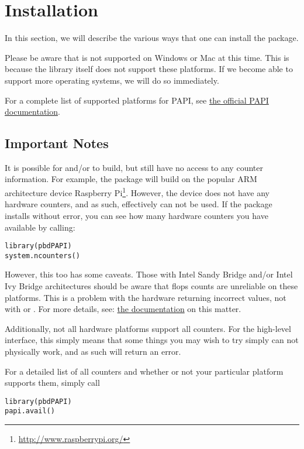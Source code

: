 \section{Installation}
\label{sec:installation}

In this section, we will describe the various ways that one can install the 
\thispackage package.

Please be aware that \thispackage is not supported on Windows or Mac at this 
time.  This is because the \PAPI library itself does not support these 
platforms.  If we become able to support more operating systems, we will do so 
immediately.

For a complete list of supported platforms for PAPI, see 
\href{http://icl.cs.utk.edu/papi/custom/index.html?lid=62&slid=96}%
{the official PAPI documentation}.



\subsection{Important Notes}

It is possible for \PAPI and/or \thispackage to build, but still have no access
to any counter information.  For example, the package will build on the popular 
ARM architecture device 
Raspberry Pi\footnote{\url{http://www.raspberrypi.org/}}.
However, the device does not have any hardware counters, and as such, 
\thispackage effectively can not be used.  If the package installs without 
error, you can see how many hardware counters you have available by calling:
\begin{lstlisting}[language=rr]
library(pbdPAPI)
system.ncounters()
\end{lstlisting}

However, this too has some caveats.  Those with Intel Sandy Bridge and/or Intel 
Ivy Bridge architectures should be aware that flops counts are unreliable on 
these platforms.  This is a problem with the hardware returning incorrect 
values, not with \PAPI or \thispackage.  For more details, see: 
\href{http://icl.cs.utk.edu/projects/papi/wiki/PAPITopics:SandyFlops}%
{the \PAPI documentation} on this matter.


Additionally, not all hardware platforms support all counters.  For the 
high-level 
interface, this simply means that some things you may wish to try simply can 
not physically work, and as such will return an error.  

For a detailed list of all counters and whether or not your particular platform 
supports them, simply call 
\begin{lstlisting}[language=rr]
library(pbdPAPI)
papi.avail()
\end{lstlisting}





